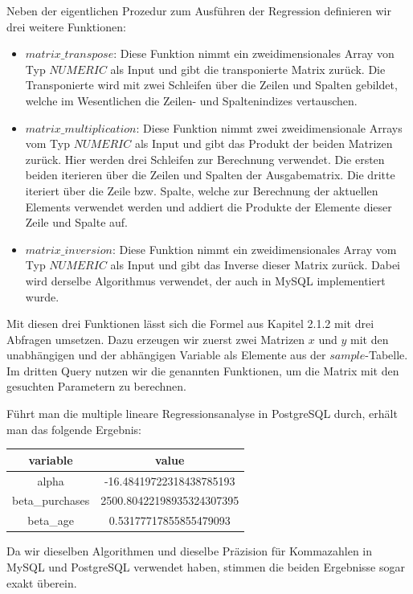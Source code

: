 Neben der eigentlichen Prozedur zum Ausführen der Regression definieren wir drei weitere Funktionen:
\begin{itemize}
  \item $matrix\_transpose$: Diese Funktion nimmt ein zweidimensionales Array von Typ $NUMERIC$ als Input und gibt die transponierte Matrix zurück. Die Transponierte wird mit zwei Schleifen über die Zeilen und Spalten gebildet, welche im Wesentlichen die Zeilen- und Spaltenindizes vertauschen.
  \item $matrix\_multiplication$: Diese Funktion nimmt zwei zweidimensionale Arrays vom Typ $NUMERIC$ als Input und gibt das Produkt der beiden Matrizen zurück. Hier werden drei Schleifen zur Berechnung verwendet. Die ersten beiden iterieren über die Zeilen und Spalten der Ausgabematrix. Die dritte iteriert über die Zeile bzw. Spalte, welche zur Berechnung der aktuellen Elements verwendet werden und addiert die Produkte der Elemente dieser Zeile und Spalte auf.
  \item $matrix\_inversion$: Diese Funktion nimmt ein zweidimensionales Array vom Typ $NUMERIC$ als Input und gibt das Inverse dieser Matrix zurück. Dabei wird derselbe Algorithmus verwendet, der auch in MySQL implementiert wurde.
\end{itemize}

Mit diesen drei Funktionen lässt sich die Formel aus Kapitel 2.1.2 mit drei Abfragen umsetzen. Dazu erzeugen wir zuerst zwei Matrizen $x$ und $y$ mit den unabhängigen und der abhängigen Variable als Elemente aus der $sample$-Tabelle. Im dritten Query nutzen wir die genannten Funktionen, um die Matrix mit den gesuchten Parametern zu berechnen.

Führt man die multiple lineare Regressionsanalyse in PostgreSQL durch, erhält man das folgende Ergebnis:

\begin{center}
  \begin{tabular}{|c|c|}\hline
    \textbf{variable} & \textbf{value} \\ \hline
    alpha & -16.48419722318438785193 \\ \hline
    beta\_purchases & 2500.80422198935324307395 \\ \hline
    beta\_age & 0.53177717855855479093 \\ \hline
  \end{tabular}
\end{center}

Da wir dieselben Algorithmen und dieselbe Präzision für Kommazahlen in MySQL und PostgreSQL verwendet haben, stimmen die beiden Ergebnisse sogar exakt überein.

